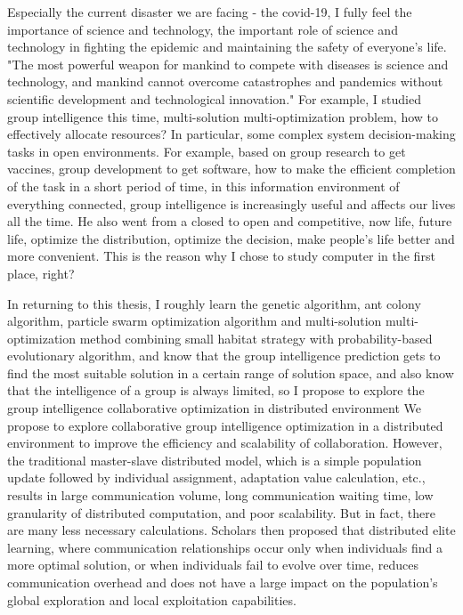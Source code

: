 \documentclass[twocolumn]{article}
\begin{document}
Especially the current disaster we are facing - the covid-19, I fully
feel the importance of science and technology, the important role of
science and technology in fighting the epidemic and maintaining the
safety of everyone's life. "The most powerful weapon for mankind to
compete with diseases is science and technology, and mankind cannot
overcome catastrophes and pandemics without scientific development and
technological innovation." For example, I studied group intelligence
this time, multi-solution multi-optimization problem, how to effectively
allocate resources? In particular, some complex system decision-making
tasks in open environments. For example, based on group research to get
vaccines, group development to get software, how to make the efficient
completion of the task in a short period of time, in this information
environment of everything connected, group intelligence is increasingly
useful and affects our lives all the time. He also went from a closed to
open and competitive, now life, future life, optimize the distribution,
optimize the decision, make people's life better and more convenient.
This is the reason why I chose to study computer in the first place,
right?

In returning to this thesis, I roughly learn the genetic algorithm, ant
colony algorithm, particle swarm optimization algorithm and
multi-solution multi-optimization method combining small habitat
strategy with probability-based evolutionary algorithm, and know that
the group intelligence prediction gets to find the most suitable
solution in a certain range of solution space, and also know that the
intelligence of a group is always limited, so I propose to explore the
group intelligence collaborative optimization in distributed environment
We propose to explore collaborative group intelligence optimization in a
distributed environment to improve the efficiency and scalability of
collaboration. However, the traditional master-slave distributed model,
which is a simple population update followed by individual assignment,
adaptation value calculation, etc., results in large communication
volume, long communication waiting time, low granularity of distributed
computation, and poor scalability. But in fact, there are many less
necessary calculations. Scholars then proposed that distributed elite
learning, where communication relationships occur only when individuals
find a more optimal solution, or when individuals fail to evolve over
time, reduces communication overhead and does not have a large impact on
the population's global exploration and local exploitation capabilities.
\end{document}
